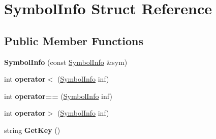 \hypertarget{structSymbolInfo}{\section{Symbol\-Info Struct Reference}
\label{structSymbolInfo}
}
\subsection*{Public Member Functions}
\begin{DoxyCompactItemize}
\item 
\hypertarget{structSymbolInfo_acb7b0eeb9676abd3b3e811eeb4a493d3}{{\bfseries Symbol\-Info} (const \hyperlink{structSymbolInfo}{Symbol\-Info} \&sym)}\label{structSymbolInfo_acb7b0eeb9676abd3b3e811eeb4a493d3}

\item 
\hypertarget{structSymbolInfo_a3d6aa82818a3ed3f8f0dc21ae16cc032}{int {\bfseries operator$<$} (\hyperlink{structSymbolInfo}{Symbol\-Info} inf)}\label{structSymbolInfo_a3d6aa82818a3ed3f8f0dc21ae16cc032}

\item 
\hypertarget{structSymbolInfo_ad695eec927b408d238f50f06c6ecde78}{int {\bfseries operator==} (\hyperlink{structSymbolInfo}{Symbol\-Info} inf)}\label{structSymbolInfo_ad695eec927b408d238f50f06c6ecde78}

\item 
\hypertarget{structSymbolInfo_a65d5949e426bf0b74c6cbada3b298ae0}{int {\bfseries operator$>$} (\hyperlink{structSymbolInfo}{Symbol\-Info} inf)}\label{structSymbolInfo_a65d5949e426bf0b74c6cbada3b298ae0}

\item 
\hypertarget{structSymbolInfo_ac3b23c499dde616bed334c147b46c6c8}{string {\bfseries Get\-Key} ()}\label{structSymbolInfo_ac3b23c499dde616bed334c147b46c6c8}

\end{DoxyCompactItemize}
